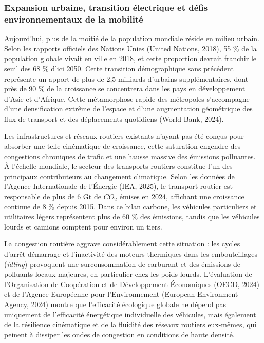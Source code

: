 \documentclass[10pt, a4paper]{article}
\begin{document}
\subsubsection{Expansion urbaine, transition électrique et défis
environnementaux de la
mobilité}\label{expansion-urbaine-transition-uxe9lectrique-et-duxe9fis-environnementaux-de-la-mobilituxe9}

Aujourd'hui, plus de la moitié de la population mondiale réside en
milieu urbain. Selon les rapports officiels des Nations Unies (United
Nations, 2018), 55 \% de la population globale vivait en ville en 2018,
et cette proportion devrait franchir le seuil des 68 \% d'ici 2050.
Cette transition démographique sans précédent représente un apport de
plus de 2,5 milliards d'urbains supplémentaires, dont près de 90 \% de
la croissance se concentrera dans les pays en développement d'Asie et
d'Afrique. Cette métamorphose rapide des métropoles s'accompagne d'une
densification extrême de l'espace et d'une augmentation géométrique des
flux de transport et des déplacements quotidiens (World Bank, 2024).

Les infrastructures et réseaux routiers existants n'ayant pas été conçus
pour absorber une telle cinématique de croissance, cette saturation
engendre des congestions chroniques de trafic et une hausse massive des
émissions polluantes. À l'échelle mondiale, le secteur des transports
routiers constitue l'un des principaux contributeurs au changement
climatique. Selon les données de l'Agence Internationale de l'Énergie
(IEA, 2025), le transport routier est responsable de plus de 6 Gt de
\(CO_2\) émises en 2024, affichant une croissance continue de 8 \%
depuis 2015. Dans ce bilan carbone, les véhicules particuliers et
utilitaires légers représentent plus de 60 \% des émissions, tandis que
les véhicules lourds et camions comptent pour environ un tiers.

La congestion routière aggrave considérablement cette situation : les
cycles d'arrêt-démarrage et l'inactivité des moteurs thermiques dans les
embouteillages (\emph{idling}) provoquent une surconsommation de
carburant et des émissions de polluants locaux majeures, en particulier
chez les poids lourds. L'évaluation de l'Organisation de Coopération et
de Développement Économiques (OECD, 2024) et de l'Agence Européenne pour
l'Environnement (European Environment Agency, 2024) montre que
l'efficacité écologique globale ne dépend pas uniquement de l'efficacité
énergétique individuelle des véhicules, mais également de la résilience
cinématique et de la fluidité des réseaux routiers eux-mêmes, qui
peinent à dissiper les ondes de congestion en conditions de haute
densité.
\end{document}
